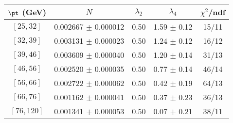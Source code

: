 \begin{tabular}{c||c|c|c|c}
$\pt$ (GeV) & $N$ & $\lambda_{2}$ & $\lambda_4$  & $\chi^2$/ndf  \\
\hline
$[25, 32]$ & 0.002667 $\pm$ 0.000012 & 0.50 & 1.59 $\pm$ 0.12 & 15/11\\
$[32, 39]$ & 0.003131 $\pm$ 0.000023 & 0.50 & 1.24 $\pm$ 0.12 & 16/12\\
$[39, 46]$ & 0.003609 $\pm$ 0.000040 & 0.50 & 1.20 $\pm$ 0.14 & 31/13\\
$[46, 56]$ & 0.002520 $\pm$ 0.000035 & 0.50 & 0.77 $\pm$ 0.14 & 46/14\\
$[56, 66]$ & 0.002722 $\pm$ 0.000062 & 0.50 & 0.42 $\pm$ 0.19 & 64/13\\
$[66, 76]$ & 0.001162 $\pm$ 0.000041 & 0.50 & 0.37 $\pm$ 0.23 & 36/13\\
$[76, 120]$ & 0.001341 $\pm$ 0.000053 & 0.50 & 0.07 $\pm$ 0.21 & 38/11\\
\end{tabular}
